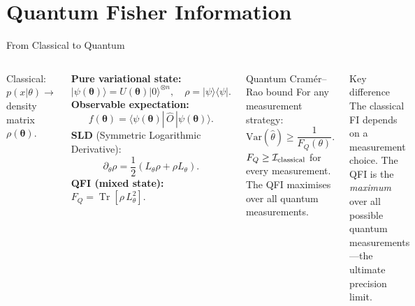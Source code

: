 \documentclass[aspectratio=169,10pt]{beamer}
\newcommand{\btheta}{\boldsymbol{\theta}}
\newcommand{\Variance}{\mathrm{Var}}
\newcommand{\Tr}{\operatorname{Tr}}
\newcommand{\FI}{\mathcal{I}}    %
\begin{document}
\section{Quantum Fisher Information}

\begin{frame}{From Classical to Quantum}
  \begin{columns}[T]
    Classical: $p(x|\theta) \to$ density matrix
    $\rho(\btheta)$.

    \medskip
    \textbf{Pure variational state:}
    \[
      |\psi(\btheta)\rangle = U(\btheta)|0\rangle^{\otimes n},
      \quad
      \rho = |\psi\rangle\langle\psi|.
    \]
    \textbf{Observable expectation:}
    \[
      f(\btheta)
      = \langle\psi(\btheta)|\,\hat{O}\,|\psi(\btheta)\rangle.
    \]
    \textbf{SLD} (Symmetric Logarithmic Derivative):
    \[
      \partial_\theta\rho
      = \frac{1}{2}(L_\theta\rho + \rho L_\theta).
    \]
    \textbf{QFI (mixed state):}
    $F_Q = \Tr[\rho\,L_\theta^2].$
    \begin{block}{Quantum Cramér--Rao bound}
      For any measurement strategy:
      \[
        \Variance(\hat\theta)\geq \frac{1}{F_Q(\theta)}.
      \]
      $F_Q\geq\FI_{\rm classical}$ for every measurement.
      The QFI maximises over all quantum measurements.
    \end{block}
    \begin{alertblock}{Key difference}
      The classical FI depends on a measurement choice.
      The QFI is the \emph{maximum} over all possible
      quantum measurements---the ultimate precision limit.
    \end{alertblock}
  \end{columns}
\end{frame}
\end{document}
